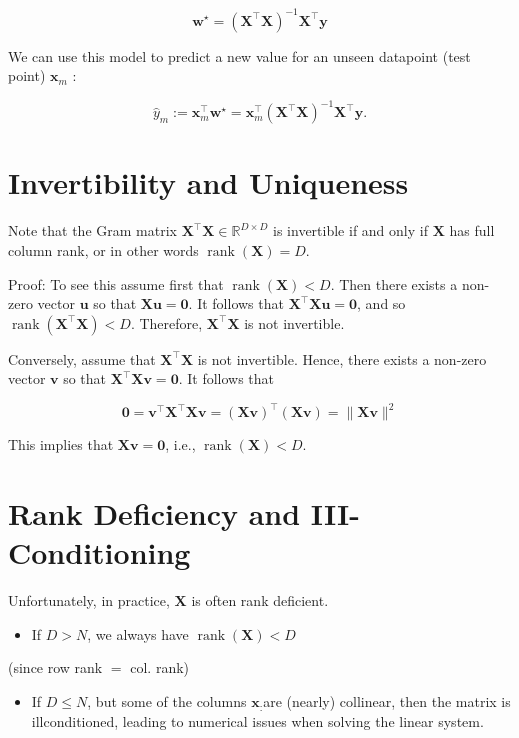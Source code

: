 \documentclass[10pt]{article}
\begin{document}
$$
\mathbf{w}^{\star}=\left(\mathbf{X}^{\top} \mathbf{X}\right)^{-1} \mathbf{X}^{\top} \mathbf{y}
$$

We can use this model to predict a new value for an unseen datapoint (test point) $\mathbf{x}_{m}$ :

$$
\hat{y}_{m}:=\mathbf{x}_{m}^{\top} \mathbf{w}^{\star}=\mathbf{x}_{m}^{\top}\left(\mathbf{X}^{\top} \mathbf{X}\right)^{-1} \mathbf{X}^{\top} \mathbf{y} .
$$

\section*{Invertibility and Uniqueness}
Note that the Gram matrix $\mathbf{X}^{\top} \mathbf{X} \in \mathbb{R}^{D \times D}$ is invertible if and only if $\mathbf{X}$ has full column rank, or in other words $\operatorname{rank}(\mathbf{X})=D$.

Proof: To see this assume first that $\operatorname{rank}(\mathbf{X})<D$. Then there exists a non-zero vector $\mathbf{u}$ so that $\mathbf{X u}=\mathbf{0}$. It follows that $\mathbf{X}^{\top} \mathbf{X u}=\mathbf{0}$, and so $\operatorname{rank}\left(\mathbf{X}^{\top} \mathbf{X}\right)<D$. Therefore, $\mathbf{X}^{\top} \mathbf{X}$ is not invertible.

Conversely, assume that $\mathbf{X}^{\top} \mathbf{X}$ is not invertible. Hence, there exists a non-zero vector $\mathbf{v}$ so that $\mathbf{X}^{\top} \mathbf{X v}=\mathbf{0}$. It follows that

$$
\mathbf{0}=\mathbf{v}^{\top} \mathbf{X}^{\top} \mathbf{X} \mathbf{v}=(\mathbf{X} \mathbf{v})^{\top}(\mathbf{X} \mathbf{v})=\|\mathbf{X} \mathbf{v}\|^{2}
$$

This implies that $\mathbf{X v}=\mathbf{0}$, i.e., $\operatorname{rank}(\mathbf{X})<D$.

\section*{Rank Deficiency and III-Conditioning}
Unfortunately, in practice, $\mathbf{X}$ is often rank deficient.

\begin{itemize}
  \item If $D>N$, we always have $\operatorname{rank}(\mathbf{X})<D$
\end{itemize}

(since row rank $=$ col. rank)

\begin{itemize}
  \item If $D \leq N$, but some of the columns $\mathbf{x}_{:}$are (nearly) collinear, then the matrix is illconditioned, leading to numerical issues when solving the linear system.
\end{itemize}
\end{document}
